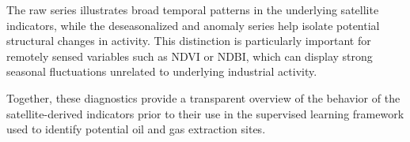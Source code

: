 \documentclass[12pt]{article}
\begin{document}
The raw series illustrates broad temporal patterns in the underlying satellite indicators, while the deseasonalized and anomaly series help isolate potential structural changes in activity. This distinction is particularly important for remotely sensed variables such as NDVI or NDBI, which can display strong seasonal fluctuations unrelated to underlying industrial activity.

Together, these diagnostics provide a transparent overview of the behavior of the satellite-derived indicators prior to their use in the supervised learning framework used to identify potential oil and gas extraction sites.
\end{document}
